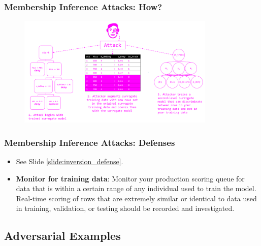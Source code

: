 \documentclass[11pt,
               aspectratio=169,
               hyperref={colorlinks}
               ]{beamer}
\begin{document}
			\begin{frame}[label={slide:membership}]
		
				\frametitle{Membership Inference Attacks: \textbf{How?}}		
			
				\begin{figure}[htb]
					\begin{center}
						\includegraphics[height=150pt]{img/membership.PNG}
					\end{center}
				\end{figure}	

			\end{frame}
			
			\begin{frame}
		
				\frametitle{Membership Inference Attacks: \textbf{Defenses}}		
			
				\begin{itemize}
					\item See Slide \ref{slide:inversion_defense}.
				\item \textbf{Monitor for training data}: Monitor your production scoring queue for data that is within a certain range of any individual used to train the model. Real-time scoring of rows that are extremely similar or identical to data used in training, validation, or testing should be recorded and investigated.
				\end{itemize}

			\end{frame}
	
		\subsection{Adversarial Examples}
	
\end{document}

